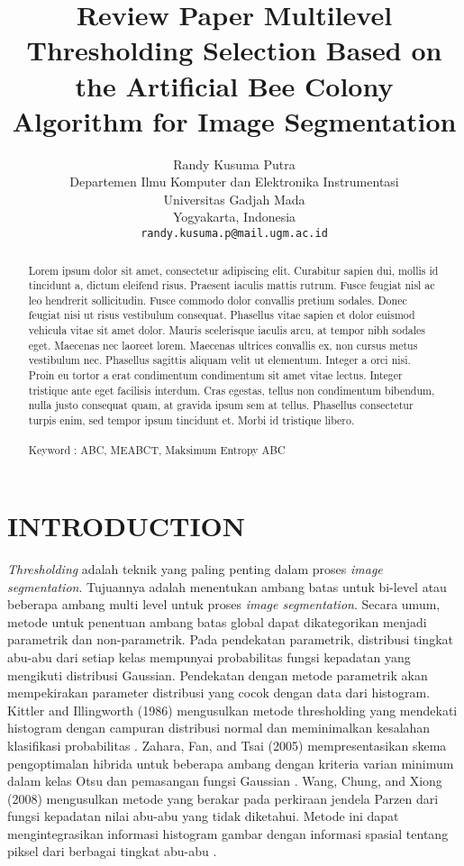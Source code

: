 \documentclass[a4paper, 10pt, conference]{ieeeconf}
\title{\LARGE \bf
Review Paper Multilevel Thresholding Selection Based on the Artificial Bee Colony Algorithm for Image Segmentation
}
\author{ \parbox{5 in}{\centering Randy Kusuma Putra\\
         Departemen Ilmu Komputer dan Elektronika Instrumentasi\\
         Universitas Gadjah Mada\\
         Yogyakarta, Indonesia\\
         {\tt\small randy.kusuma.p@mail.ugm.ac.id}}
         \hspace*{ 0.5 in}
}
\begin{document}
\maketitle
\thispagestyle{empty}
\pagestyle{empty}


\begin{abstract}

Lorem ipsum dolor sit amet, consectetur adipiscing elit. Curabitur sapien dui, mollis id tincidunt a, dictum eleifend risus. Praesent iaculis mattis rutrum. Fusce feugiat nisl ac leo hendrerit sollicitudin. Fusce commodo dolor convallis pretium sodales. Donec feugiat nisi ut risus vestibulum consequat. Phasellus vitae sapien et dolor euismod vehicula vitae sit amet dolor. Mauris scelerisque iaculis arcu, at tempor nibh sodales eget. Maecenas nec laoreet lorem. Maecenas ultrices convallis ex, non cursus metus vestibulum nec. Phasellus sagittis aliquam velit ut elementum. Integer a orci nisi. Proin eu tortor a erat condimentum condimentum sit amet vitae lectus. Integer tristique ante eget facilisis interdum. Cras egestas, tellus non condimentum bibendum, nulla justo consequat quam, at gravida ipsum sem at tellus. Phasellus consectetur turpis enim, sed tempor ipsum tincidunt et. Morbi id tristique libero.\\
\\
Keyword : ABC, MEABCT, Maksimum Entropy ABC

\end{abstract}


\section{INTRODUCTION}

\textit{Thresholding} adalah teknik yang paling penting dalam proses \textit{image segmentation}. Tujuannya adalah menentukan ambang batas untuk bi-level atau beberapa ambang multi level untuk proses \textit{image segmentation}. Secara umum, metode untuk penentuan ambang batas global dapat dikategorikan menjadi parametrik dan non-parametrik. Pada pendekatan parametrik, distribusi tingkat abu-abu dari setiap kelas mempunyai probabilitas fungsi kepadatan yang mengikuti distribusi Gaussian. Pendekatan dengan metode parametrik akan mempekirakan parameter distribusi yang cocok dengan data dari histogram. 
Kittler and Illingworth (1986) mengusulkan metode thresholding yang mendekati histogram dengan campuran distribusi normal dan meminimalkan kesalahan klasifikasi probabilitas \cite{c1}. 
Zahara, Fan, and Tsai (2005) mempresentasikan skema pengoptimalan hibrida untuk beberapa ambang dengan kriteria varian minimum dalam kelas Otsu dan pemasangan fungsi Gaussian \cite{c2}. 
Wang, Chung, and Xiong (2008) mengusulkan metode yang berakar pada perkiraan jendela Parzen dari fungsi kepadatan nilai abu-abu yang tidak diketahui. Metode ini dapat mengintegrasikan informasi histogram gambar dengan informasi spasial tentang piksel dari berbagai tingkat abu-abu \cite{c3}.\par
\end{document}
